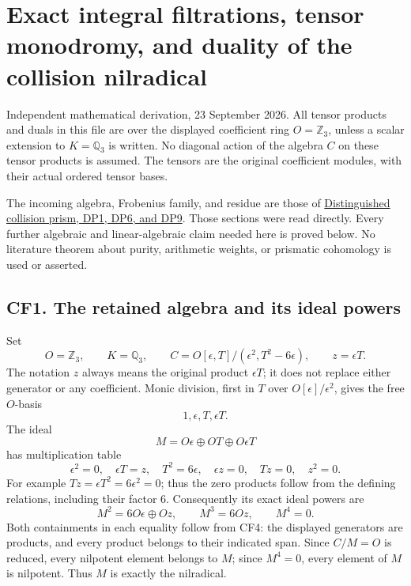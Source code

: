 \section{Exact integral filtrations, tensor monodromy, and duality of the collision nilradical}\label{exact-integral-filtrations-tensor-monodromy-and-duality-of-the-collision-nilradical}

Independent mathematical derivation, 23 September 2026. All tensor products and duals in this file are over the displayed coefficient ring \(O=\mathbb Z_3\), unless a scalar extension to \(K=\mathbb Q_3\) is written. No diagonal action of the algebra \(C\) on these tensor products is assumed. The tensors are the original coefficient modules, with their actual ordered tensor bases.

The incoming algebra, Frobenius family, and residue are those of \href{DISTINGUISHED_COLLISION_PRISM_DERIVATION.md}{Distinguished collision prism, DP1, DP6, and DP9}. Those sections were read directly. Every further algebraic and linear-algebraic claim needed here is proved below. No literature theorem about purity, arithmetic weights, or prismatic cohomology is used or asserted.

\subsection{CF1. The retained algebra and its ideal powers}\label{cf1.-the-retained-algebra-and-its-ideal-powers}

Set
\[
 O=\mathbb Z_3,\qquad K=\mathbb Q_3,\qquad
 C=O[\epsilon,T]/(\epsilon^2,T^2-6\epsilon),\qquad z=\epsilon T.
 \tag{CF1}
\]
The notation \(z\) always means the original product \(\epsilon T\); it does not replace either generator or any coefficient. Monic division, first in \(T\) over \(O[\epsilon]/\epsilon^2\), gives the free \(O\)-basis
\[
 1,\epsilon,T,\epsilon T.
 \tag{CF2}
\]
The ideal
\[
 M=O\epsilon\oplus OT\oplus O\epsilon T
 \tag{CF3}
\]
has multiplication table
\[
 \epsilon^2=0,\quad \epsilon T=z,\quad T^2=6\epsilon,
 \quad \epsilon z=0,\quad Tz=0,\quad z^2=0.
 \tag{CF4}
\]
For example \(Tz=\epsilon T^2=6\epsilon^2=0\); thus the zero products follow from the defining relations, including their factor \(6\).
Consequently its exact ideal powers are
\[
 M^2=6O\epsilon\oplus Oz,\qquad M^3=6Oz,
 \qquad M^4=0.
 \tag{CF5}
\]
Both containments in each equality follow from CF4: the displayed generators are products, and every product belongs to their indicated span. Since \(C/M=O\) is reduced, every nilpotent element belongs to \(M\); since \(M^4=0\), every element of \(M\) is nilpotent. Thus \(M\) is exactly the nilradical.

